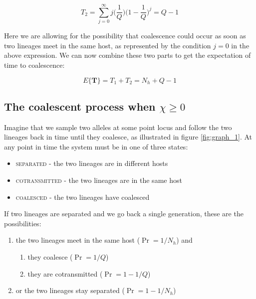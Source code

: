 \documentclass[_main.tex]{subfiles}
\begin{document}
\begin{equation*}
T_2 =
\sum_{j=0}^\infty
j \Big( \frac{1}{Q} \Big)
\Big( 1 - \frac{1}{Q} \Big)^{j}
= Q - 1
\end{equation*}

Here we are allowing for the possibility that coalescence could occur as soon as two lineages meet in the same host, as represented by the condition $j=0$ in the above expression.   We can now combine these two parts to get the expectation of time to coalescence:

\begin{equation*}
\label{eq:Nh+Q-1}
E \{ \textbf{T} \}   
= T_1 + T_2
= N_h + Q - 1
\end{equation*}

\subsection{The coalescent process when $\chi \ge 0$}
\label{supp_coalescent}

Imagine that we sample two alleles at some point locus and follow the two lineages back in time until they coalesce, as illustrated in figure \ref{fig:graph_1}.  At any point in time the system must be in one of three states:

\begin{itemize} [noitemsep]

\item \textsc{separated} - the two lineages are in different hosts

\item \textsc{cotransmitted} - the two lineages are in the same host

\item \textsc{coalesced} - the two lineages have coalesced

\end{itemize}

\noindent If two lineages are separated and we go back a single generation, these are the possibilities:

\begin{enumerate}

\item the two lineages meet in the same host ($\Pr = 1/N_h$) and

\begin{enumerate}

\item they coalesce ($\Pr = 1/Q$) 

\item they are cotransmitted ($\Pr = 1 - 1/Q$) 

\end{enumerate}

\item or the two lineages stay separated ($\Pr = 1 -  1/N_h$)

\end{enumerate}
\end{document}
